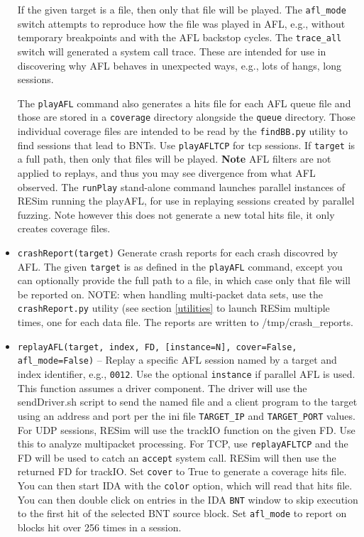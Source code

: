 \documentclass[titlepage]{article}
\begin{document}
\begin{itemize}
If the given target is a file, then only that file will be played.  The {\tt afl\_mode} switch attempts to reproduce how the file was played in AFL, e.g., without temporary
breakpoints and with the AFL backstop cycles.  The {\tt trace\_all} switch will generated a system call trace.  These are intended for use in discovering why AFL
behaves in unexpected ways, e.g., lots of hangs, long sessions.

The {\tt playAFL} command also generates a hits file for each AFL queue file and those are stored in a {\tt coverage} directory alongside the {\tt queue} directory.
Those individual coverage files are intended to be read by the {\tt findBB.py} utility to find sessions that lead to BNTs.  Use {\tt playAFLTCP} for tcp sessions.
If {\tt target} is a full path, then only that files will be played.  \textbf{Note} AFL filters are not applied to replays, and thus you may see divergence from what AFL observed.
The {\tt runPlay} stand-alone command launches parallel instances of RESim running the playAFL, for use in replaying sessions created by parallel fuzzing.  Note however this 
does not generate a new total hits file, it only creates coverage files.

\item{\tt crashReport(target)} Generate crash reports for each crash discovred by AFL.  The given {\tt target} is as defined in the {\tt playAFL} command, except you can optionally provide the
full path to a file, in which case only that file will be reported on.  NOTE: when handling multi-packet data sets, use the {\tt crashReport.py} utility (see section \ref{utilities} to launch RESim multiple times,
one for each data file.  The reports are written to /tmp/crash\_reports.

\item{\tt replayAFL(target, index, FD, [instance=N], cover=False, afl\_mode=False)} -- Replay a specific AFL session named by a target and index identifier, e.g., {\tt 0012}.  Use the optional {\tt instance} if parallel AFL is used.  This function assumes a driver component. The driver will use the sendDriver.sh script to send the named file and
a client program to the target using an address and port per the ini file {\tt TARGET\_IP} and {\tt TARGET\_PORT} values.  For UDP sessions, RESim will use the trackIO function on the given FD.  Use this to analyze multipacket processing.  For TCP, use {\tt replayAFLTCP} and the FD will be used to catch an {\tt accept} system call.  RESim will then use the returned FD for trackIO.  Set {\tt cover} to True to generate a coverage hits file.  You can then start IDA with the {\tt color} option, which
will read that hits file.   You can then double click on entries in the IDA {\tt BNT} window to skip execution to the first hit of the selected BNT source block.
Set {\tt afl\_mode} to report on blocks hit over 256 times in a session.


\end{itemize}
\end{document}
